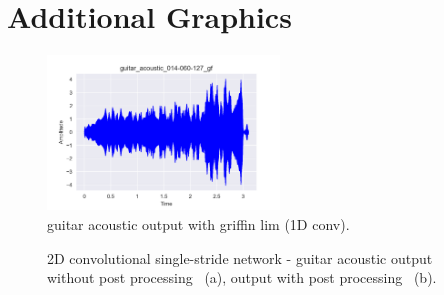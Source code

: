 \chapter{Additional Graphics}
\label{app:addional_graphics}


\begin{figure}[htb!]
    \centering
    \includegraphics[width=0.55\textwidth]{images/appendix/1D/guitar_acoustic_014-060-127_gf.png}
    \caption{guitar acoustic output with griffin lim (1D conv).}
    \label{fig:res_2D_mel_guit}
\end{figure}


\begin{figure}[htb!]
    \centering
    \captionsetup{justification=centering}
    \caption{2D convolutional single-stride network - guitar acoustic output without post processing ~(a), output with post processing ~(b).}
    \label{fig:apx_single_phase}
\end{figure}

